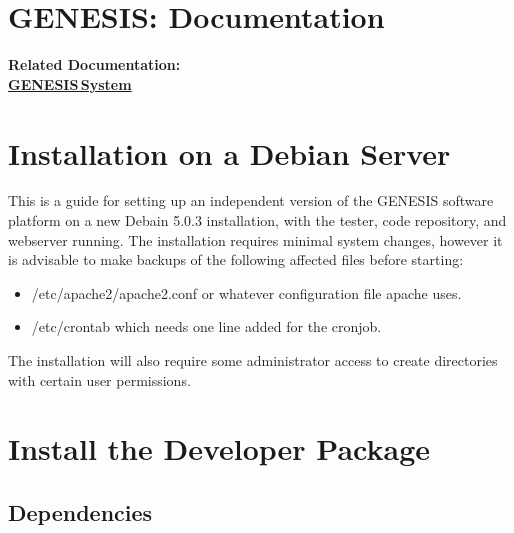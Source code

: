 \documentclass[12pt]{article}
\begin{document}
\section*{GENESIS: Documentation}

{\bf Related Documentation:} \\
\href{../genesis-system/genesis-system.tex}{\bf GENESIS\,System}

\section*{Installation on a Debian Server}

This is a guide for setting up an independent version of the GENESIS software platform on a new Debain 5.0.3 installation, with the tester, code repository, and webserver running. The installation requires minimal system changes, however it is advisable to make backups of the following affected files before starting:

\begin{itemize}
\item[] /etc/apache2/apache2.conf or whatever configuration file apache uses.
\item[] /etc/crontab which needs one line added for the cronjob.
\end{itemize}

The installation will also require some administrator access to create directories with certain user permissions. 

\section*{Install the Developer Package}

\subsection*{Dependencies}
\end{document}
